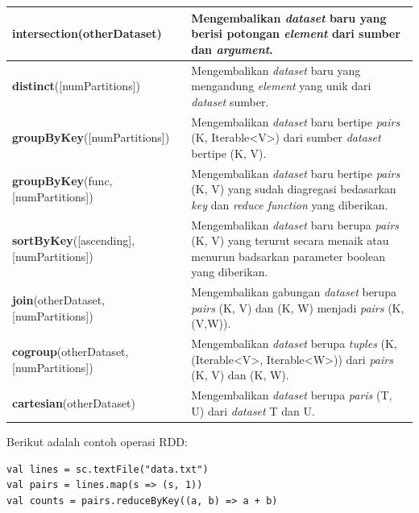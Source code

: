 \documentclass[a4paper,twoside]{article}
\begin{document}
\begin{enumerate}
\begin{table}[H]
\begin{tabular}{ p{6cm}p{9cm}}
\hline
\textbf{intersection}(otherDataset) & Mengembalikan \textit{dataset} baru yang berisi potongan \textit{element} dari sumber dan \textit{argument}.\\ 

\hline
\textbf{distinct}([numPartitions]) & Mengembalikan \textit{dataset} baru yang mengandung \textit{element} yang unik dari \textit{dataset} sumber.\\

\hline
\textbf{groupByKey}([numPartitions]) & Mengembalikan \textit{dataset} baru bertipe \textit{pairs}  (K, Iterable<V>) dari sumber \textit{dataset} bertipe (K, V).\\


\hline
\textbf{groupByKey}(func,[numPartitions]) & Mengembalikan \textit{dataset} baru bertipe \textit{pairs}  (K, V) yang sudah diagregasi bedasarkan \textit{key} dan \textit{reduce function} yang diberikan.\\

\hline
\textbf{sortByKey}([ascending], [numPartitions]) & Mengembalikan \textit{dataset} baru berupa \textit{pairs}  (K, V) yang terurut secara menaik atau menurun badsarkan parameter boolean yang diberikan.\\

\hline
\textbf{join}(otherDataset, [numPartitions]) & Mengembalikan gabungan \textit{dataset} berupa \textit{pairs}  (K, V) dan (K, W) menjadi \textit{pairs} (K, (V,W)).\\

\hline
\textbf{cogroup}(otherDataset, [numPartitions]) & Mengembalikan \textit{dataset} berupa \textit{tuples}  (K, (Iterable<V>, Iterable<W>)) dari \textit{pairs} (K, V) dan (K, W).\\

\hline
\textbf{cartesian}(otherDataset) & Mengembalikan \textit{dataset} berupa \textit{paris}  (T, U) dari \textit{dataset} T dan U.\\

\hline



	\end{tabular} 
\end{table}

Berikut adalah contoh operasi RDD:
\begin{verbatim}
val lines = sc.textFile("data.txt") 
val pairs = lines.map(s => (s, 1))
val counts = pairs.reduceByKey((a, b) => a + b)
\end{verbatim}


\end{enumerate}
\end{document}
